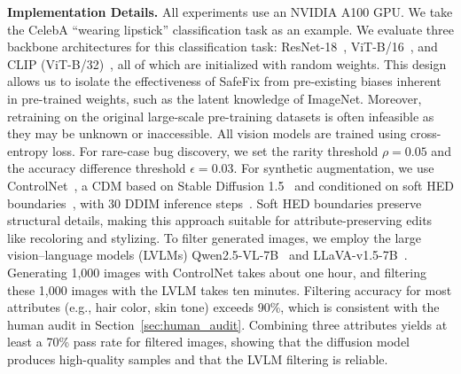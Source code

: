 \documentclass[10pt]{article} %
\newcommand{\controlnet}{ControlNet\xspace}
\newcommand{\qwen}{Qwen2.5-VL\xspace}
\newcommand{\llava}{LLaVA-v1.5\xspace}
\begin{document}
\noindent \textbf{Implementation Details.} All experiments use an NVIDIA A100 GPU\@.
We take the CelebA ``wearing lipstick'' classification task as an example.  
We evaluate three backbone architectures for this classification task: ResNet-18~\citep{he2016deep}, ViT-B/16~\citep{dosovitskiy2020vit}, and CLIP (ViT-B/32)~\citep{radford2021learning}, all of which are initialized with random weights. This design allows us to isolate the effectiveness of SafeFix from pre-existing biases inherent in pre-trained weights, such as the latent knowledge of ImageNet. Moreover, retraining on the original large-scale pre-training datasets is often infeasible as they may be unknown or inaccessible. All vision models are trained using cross-entropy loss. For rare-case bug discovery, we set the rarity threshold \(\rho = 0.05\) and the accuracy difference threshold \(\epsilon = 0.03\). For synthetic augmentation, we use \controlnet~\citep{zhang2023adding}, a CDM based on Stable Diffusion 1.5~\citep{rombach2022high} and conditioned on soft HED boundaries~\citep{xie2015holistically}, with 30 DDIM inference steps~\citep{song2021ddim}. Soft HED boundaries preserve structural details, making this approach suitable for attribute-preserving edits like recoloring and stylizing.
To filter generated images, we employ the large vision--language models (LVLMs) \qwen{}-7B~\citep{bai2025qwen25vl} and \llava{}-7B~\citep{liu2023improvedllava}. Generating 1,000 images with ControlNet takes about one hour, and filtering these 1,000 images with the LVLM takes ten minutes. Filtering accuracy for most attributes (e.g., hair color, skin tone) exceeds 90\%, which is consistent with the human audit in Section~\ref{sec:human_audit}. Combining three attributes yields at least a 70\% pass rate for filtered images, showing that the diffusion model produces high-quality samples and that the LVLM filtering is reliable.
\end{document}
